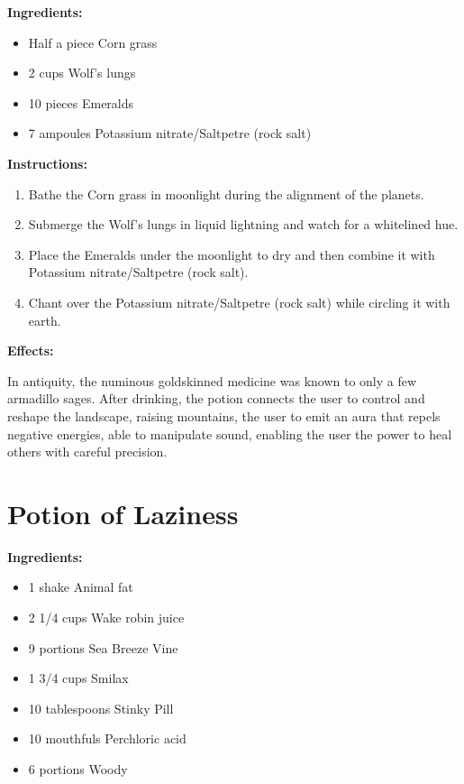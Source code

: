 \documentclass{article}
\begin{document}
\textbf{Ingredients:}

\begin{itemize}
  \item Half a piece Corn grass
  \item 2 cups Wolf's lungs
  \item 10 pieces Emeralds
  \item 7 ampoules Potassium nitrate/Saltpetre (rock salt)
\end{itemize}

\textbf{Instructions:}

\begin{enumerate}
  \item Bathe the Corn grass in moonlight during the alignment of the planets.
  \item Submerge the Wolf's lungs in liquid lightning and watch for a whitelined hue.
  \item Place the Emeralds under the moonlight to dry and then combine it with Potassium nitrate/Saltpetre (rock salt).
  \item Chant over the Potassium nitrate/Saltpetre (rock salt) while circling it with earth.
\end{enumerate}

\textbf{Effects:}

In antiquity, the numinous goldskinned medicine was known to only a few armadillo sages. After drinking, the potion connects the user to control and reshape the landscape, raising mountains, the user to emit an aura that repels negative energies, able to manipulate sound, enabling the user the power to heal others with careful precision.

\newpage
\section*{Potion of Laziness}

\textbf{Ingredients:}

\begin{itemize}
  \item 1 shake Animal fat
  \item 2 1/4 cups Wake robin juice
  \item 9 portions Sea Breeze Vine
  \item 1 3/4 cups Smilax
  \item 10 tablespoons Stinky Pill
  \item 10 mouthfuls Perchloric acid
  \item 6 portions Woody
\end{itemize}
\end{document}
